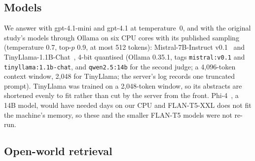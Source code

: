 \documentclass[conference]{IEEEtran}
\begin{document}
\subsection{Models}

We answer with gpt-4.1-mini and gpt-4.1 at temperature~0, and with the original study's models through
Ollama on six CPU cores with its published sampling (temperature 0.7, top-$p$ 0.9, at most 512 tokens):
Mistral-7B-Instruct v0.1~\cite{jiang2023mistral} and TinyLlama-1.1B-Chat~\cite{zhang2024tinyllama}, 4-bit
quantised (Ollama 0.35.1, tags \texttt{mistral:v0.1} and \texttt{tinyllama:1.1b-chat}, and
\texttt{qwen2.5:14b} for the second judge; a 4,096-token context window, 2,048 for TinyLlama; the server's
log records one truncated prompt). TinyLlama was trained on a 2,048-token window, so its
abstracts are shortened evenly to fit rather than cut by the server from the front. Phi-4~\cite{abdin2024phi4}, a 14B model,
would have needed days on our CPU and FLAN-T5-XXL does not fit the machine's memory, so these and the
smaller FLAN-T5 models were not re-run.

\subsection{Open-world retrieval}
\label{sec:retrieval}
\end{document}
